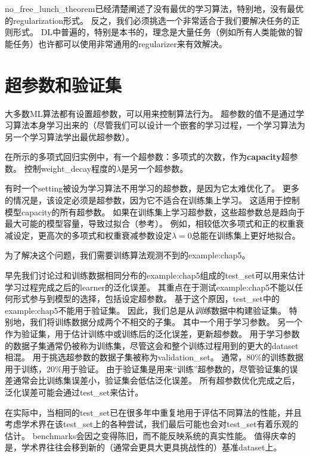 \gls{no_free_lunch_theorem}已经清楚阐述了没有最优的学习算法，特别地，没有最优的\gls{regularization}形式。
反之，我们必须挑选一个非常适合于我们要解决任务的正则形式。
\gls{DL}中普遍的，特别是本书的，理念是大量任务（例如所有人类能做的智能任务）也许都可以使用非常通用的\gls{regularizer}来有效解决。

\section{超参数和验证集}
\label{sec:hyperparameters_and_validation_sets}
大多数\gls{ML}算法都有设置超参数，可以用来控制算法行为。
超参数的值不是通过学习算法本身学习出来的（尽管我们可以设计一个嵌套的学习过程，一个学习算法为另一个学习算法学出最优超参数）。

在所示的多项式回归实例中，有一个超参数：多项式的次数，作为\textbf{\gls{capacity}}超参数。
控制\gls{weight_decay}程度的$\lambda$是另一个超参数。

有时一个\gls{setting}被设为学习算法不用学习的超参数，是因为它太难优化了。
更多的情况是，该设定必须是超参数，因为它不适合在训练集上学习。
这适用于控制模型\gls{capacity}的所有超参数。
如果在训练集上学习超参数，这些超参数总是趋向于最大可能的模型容量，导致过拟合（参考）。
例如，相较低次多项式和正的权重衰减设定，更高次的多项式和权重衰减参数设定$\lambda=0$总能在训练集上更好地拟合。


为了解决这个问题，我们需要训练算法观测不到的\gls{example:chap5}。

早先我们讨论过和训练数据相同分布的\gls{example:chap5}组成的\gls{test_set}可以用来估计学习过程完成之后的\gls{learner}的泛化误差。
其重点在于测试\gls{example:chap5}不能以任何形式参与到模型的选择，包括设定超参数。
基于这个原因，\gls{test_set}中的\gls{example:chap5}不能用于验证集。
因此，我们总是从\emph{训练}数据中构建验证集。
特别地，我们将训练数据分成两个不相交的子集。
其中一个用于学习参数。
另一个作为验证集，用于估计训练中或训练后的泛化误差，更新超参数。
用于学习参数的数据子集通常仍被称为训练集，尽管这会和整个训练过程用到的更大的\gls{dataset}相混。
用于挑选超参数的数据子集被称为\gls{validation_set}。
通常，$80\%$的训练数据用于训练，$20\%$用于验证。
由于验证集是用来``训练''超参数的，尽管验证集的误差通常会比训练集误差小，验证集会低估泛化误差。
所有超参数优化完成之后，泛化误差可能会通过\gls{test_set}来估计。

在实际中，当相同的\gls{test_set}已在很多年中重复地用于评估不同算法的性能，并且考虑学术界在该\gls{test_set}上的各种尝试，我们最后可能也会对\gls{test_set}有着乐观的估计。
\gls{benchmarks}会因之变得陈旧，而不能反映系统的真实性能。
值得庆幸的是，学术界往往会移到新的（通常会更具大更具挑战性的）基准\gls{dataset}上。

